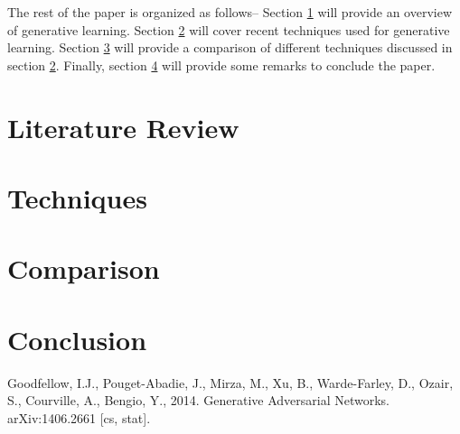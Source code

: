 \documentclass[conference]{IEEEtran}
\begin{document}
The rest of the paper is organized as follows-- Section \ref{lr} will provide an overview of generative learning. Section \ref{techniques} will cover recent techniques used for generative learning. Section \ref{comparison} will provide a comparison of different techniques discussed in section \ref{techniques}. Finally, section \ref{conclusion} will provide some remarks to conclude the paper. 

\section{Literature Review}
\label{lr}

\section{Techniques}
\label{techniques}

\section{Comparison}
\label{comparison}

\section{Conclusion}
\label{conclusion}

\begin{thebibliography}{00}
 Goodfellow, I.J., Pouget-Abadie, J., Mirza, M., Xu, B., Warde-Farley, D., Ozair, S., Courville, A., Bengio, Y., 2014. Generative Adversarial Networks. arXiv:1406.2661 [cs, stat].

\end{thebibliography}
\end{document}
